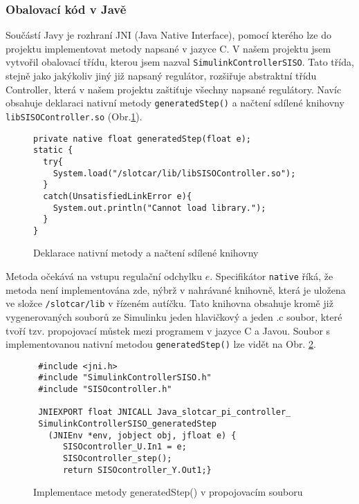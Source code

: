 \documentclass[thesis=M,czech,hidelinks]{FITthesis}[2012/06/26]
\begin{document}
\subsubsection*{Obalovací kód v Javě}
Součástí Javy je rozhraní JNI (Java Native Interface), pomocí kterého lze do projektu implementovat metody napsané v jazyce C. V našem projektu jsem vytvořil obalovací třídu, kterou jsem nazval \texttt{SimulinkControllerSISO}. Tato třída, stejně  jako jakýkoliv jiný již napsaný regulátor, rozšiřuje abstraktní třídu Controller, která v našem projektu zaštiťuje všechny napsané regulátory. Navíc obsahuje deklaraci nativní metody \texttt{generatedStep()} a načtení sdílené knihovny \texttt{libSISOController.so} (Obr.\ref{fig:SISO.java}).
\begin{figure}[h]               
  \begin{verbatim}
private native float generatedStep(float e); 
static {
  try{
    System.load("/slotcar/lib/libSISOController.so");
  }
  catch(UnsatisfiedLinkError e){
    System.out.println("Cannot load library.");
  }
} 
  \end{verbatim}      
  \caption{Deklarace nativní metody a načtení sdílené knihovny}
  \label{fig:SISO.java}
\end{figure}

Metoda očekává na vstupu regulační odchylku $e$. Specifikátor \texttt{native} říká, že metoda není implementována zde, nýbrž v nahrávané knihovně, která je uložena ve složce \texttt{/slotcar/lib} v řízeném autíčku. Tato knihovna obsahuje kromě již vygenerovaných souborů ze Simulinku jeden hlavičkový a jeden .c soubor, které tvoří tzv. propojovací můstek mezi programem v jazyce C a Javou. Soubor s implementovanou nativní metodou \texttt{generatedStep()} lze vidět na Obr. \ref{fig:SISO.c}. 
\begin{figure}[h]           
  \begin{verbatim}
 #include <jni.h>   
 #include "SimulinkControllerSISO.h"  
 #include "SISOcontroller.h"

 JNIEXPORT float JNICALL Java_slotcar_pi_controller_
 SimulinkControllerSISO_generatedStep
   (JNIEnv *env, jobject obj, jfloat e) {
      SISOcontroller_U.In1 = e;
      SISOcontroller_step();
      return SISOcontroller_Y.Out1;} 
  \end{verbatim}      
  \caption{Implementace metody generatedStep() v propojovacím souboru}
  \label{fig:SISO.c}
\end{figure} 
\end{document}
